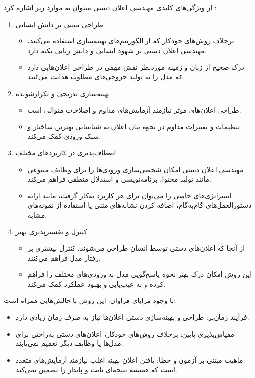 از ویژگی‌های کلیدی مهندسی اعلان دستی میتوان به موارد زیر اشاره کرد :
\begin{enumerate}
	\item طراحی مبتنی بر دانش انسانی 
	\begin{itemize}
		\item برخلاف روش‌های خودکار که از الگوریتم‌های بهینه‌سازی استفاده می‌کنند، مهندسی اعلان دستی بر شهود انسانی و دانش زبانی تکیه دارد.
		\item درک صحیح از زبان و زمینه موردنظر نقش مهمی در طراحی اعلان‌هایی دارد که مدل را به تولید خروجی‌های مطلوب هدایت می‌کنند. 
	\end{itemize}
	
	\item بهینه‌سازی تدریجی و تکرارشونده
	\begin{itemize}
		\item طراحی اعلان‌های مؤثر نیازمند آزمایش‌های مداوم و اصلاحات متوالی است. 
		\item تنظیمات و تغییرات مداوم در نحوه بیان اعلان به شناسایی بهترین ساختار و سبک ورودی کمک می‌کند. 
	\end{itemize}
	
	\item انعطاف‌پذیری در کاربردهای مختلف
	\begin{itemize}
		\item مهندسی اعلان دستی امکان شخصی‌سازی ورودی‌ها را برای وظایف متنوعی مانند تولید محتوا، برنامه‌نویسی و استدلال منطقی فراهم می‌کند.  
		\item استراتژی‌های خاصی را می‌توان برای هر کاربرد به‌کار گرفت، مانند ارائه دستورالعمل‌های گام‌به‌گام، اضافه کردن نشانه‌های متنی یا استفاده از نمونه‌های مشابه.
	\end{itemize}
	
	\item کنترل و تفسیرپذیری بهتر
	\begin{itemize}
		\item از آنجا که اعلان‌های دستی توسط انسان طراحی می‌شوند، کنترل بیشتری بر رفتار مدل فراهم می‌کنند.  
		\item این روش امکان درک بهتر نحوه پاسخ‌گویی مدل به ورودی‌های مختلف را فراهم کرده و به عیب‌یابی و بهبود عملکرد کمک می‌کند.
	\end{itemize}
\end{enumerate}

با وجود مزایای فراوان، این روش با چالش‌هایی همراه است:  
\begin{itemize}
	\item فرآیند زمان‌بر: طراحی و بهینه‌سازی دستی اعلان‌ها نیاز به صرف زمان زیادی دارد.  
	\item مقیاس‌پذیری پایین: برخلاف روش‌های خودکار، اعلان‌های دستی به‌راحتی برای مدل‌ها یا وظایف دیگر تعمیم نمی‌یابند.  
	\item ماهیت مبتنی بر آزمون و خطا: یافتن اعلان بهینه اغلب نیازمند آزمایش‌های متعدد است که همیشه نتیجه‌ای ثابت و پایدار را تضمین نمی‌کند.  
\end{itemize}

